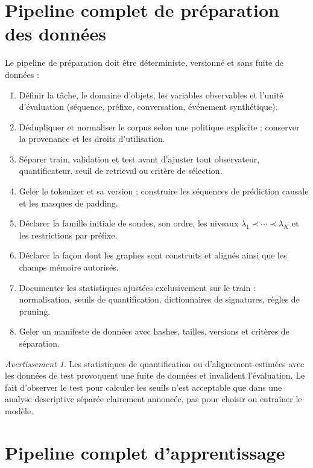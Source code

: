 \documentclass[11pt,a4paper]{article}
\theoremstyle{remark}
\newtheorem{warning}[definition]{Avertissement}
\begin{document}
\section{Pipeline complet de préparation des données}

Le pipeline de préparation doit être déterministe, versionné et sans fuite de données :
\begin{enumerate}[label=\textbf{D\arabic*.}]
  \item Définir la tâche, le domaine d'objets, les variables observables et l'unité d'évaluation (séquence, préfixe, conversation, événement synthétique).
  \item Dédupliquer et normaliser le corpus selon une politique explicite ; conserver la provenance et les droits d'utilisation.
  \item Séparer train, validation et test avant d'ajuster tout observateur, quantificateur, seuil de retrieval ou critère de sélection.
  \item Geler le tokenizer et sa version ; construire les séquences de prédiction causale et les masques de padding.
  \item Déclarer la famille initiale de sondes, son ordre, les niveaux $\lambda_1\prec\cdots\prec\lambda_K$ et les restrictions par préfixe.
  \item Déclarer la façon dont les graphes sont construits et alignés ainsi que les champs mémoire autorisés.
  \item Documenter les statistiques ajustées exclusivement sur le train : normalisation, seuils de quantification, dictionnaires de signatures, règles de pruning.
  \item Geler un manifeste de données avec hashes, tailles, versions et critères de séparation.
\end{enumerate}

\begin{warning}
Les statistiques de quantification ou d'alignement estimées avec les données de test provoquent une fuite de données et invalident l'évaluation. Le fait d'observer le test pour calculer les seuils n'est acceptable que dans une analyse descriptive séparée clairement annoncée, pas pour choisir ou entraîner le modèle.
\end{warning}

\section{Pipeline complet d'apprentissage}
\end{document}

